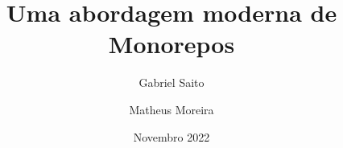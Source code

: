 \documentclass[12pt]{article}
\title{Uma abordagem moderna de Monorepos}
\author{Gabriel Saito \and Matheus Moreira}
\date{Novembro 2022}
\begin{document}
  \maketitle

  \newpage
  \tableofcontents
  \onehalfspacing

  \nocite{*}

  
  

  
  
  
  
  
  
  

  \newpage
  \printbibliography
\end{document}
